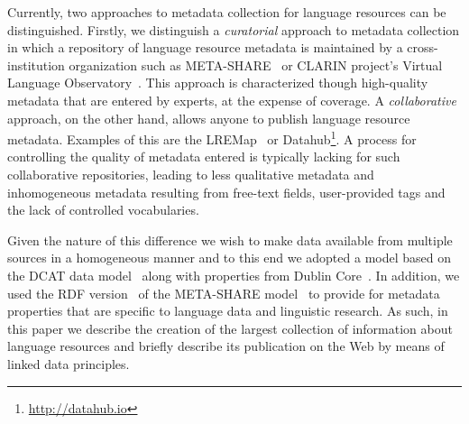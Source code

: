 \documentclass{acm_proc_article-sp}
\begin{document}
Currently, two approaches to metadata collection for language resources can be
distinguished. Firstly, we distinguish a \emph{curatorial} approach to metadata
collection in which a repository of language resource metadata is maintained by
a cross-institution organization such as META-SHARE~\cite{federmann2012meta} or
CLARIN project's Virtual Language Observatory~\cite[VLO]{van2012semantic}. This
approach is characterized though high-quality metadata that are entered by
experts, at the expense of coverage. A \emph{collaborative} approach, on the other
hand, allows anyone to publish language resource metadata. Examples of this are
the LREMap~\cite{calzolari2012lre} or Datahub\footnote{\url{http://datahub.io}}. A process for controlling the quality of metadata entered
is typically lacking for such collaborative repositories, leading to less
qualitative metadata and inhomogeneous metadata resulting from free-text fields,
user-provided tags and the lack of controlled vocabularies.

Given the nature of this difference we wish to make data available from multiple
sources in a homogeneous manner and to this end we adopted a model based on the
DCAT data model~\cite{maali2014data} along with properties from Dublin
Core~\cite{weibel1998dublin}. In addition, we used the RDF
version~\cite{mccrae2015ontology} of the META-SHARE
model~\cite{gavrilidou2012meta} to provide for metadata properties that are
specific to language data and linguistic research. As such, in this paper we
describe the creation of the largest collection of information about language
resources and briefly describe its publication on the Web by means of linked
data principles.
\end{document}
